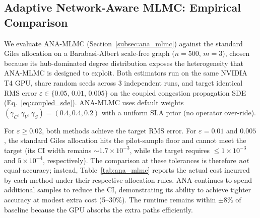 \documentclass{ieeeaccess}
\begin{document}
\subsection{Adaptive Network-Aware MLMC: Empirical Comparison}
\label{subsec:ana_results}

We evaluate ANA-MLMC (Section~\ref{subsec:ana_mlmc}) against the standard Giles allocation on a
Barabasi-Albert scale-free graph ($n=500$, $m=3$), chosen because its hub-dominated degree
distribution exposes the heterogeneity that ANA-MLMC is designed to exploit. Both estimators run
on the same NVIDIA T4 GPU, share random seeds across 3 independent runs, and target identical RMS
error $\varepsilon \in \{0.05,\,0.01,\,0.005\}$ on the coupled congestion propagation SDE
(Eq.~\eqref{eq:coupled_sde}). ANA-MLMC uses default weights
$(\gamma_C,\gamma_V,\gamma_S)=(0.4,0.4,0.2)$ with a uniform SLA prior (no operator over-ride).

For \(\varepsilon \geq 0.02\), both methods achieve the target RMS error. 
For \(\varepsilon = 0.01\) and \(0.005\), the standard Giles allocation hits the pilot-sample floor and 
cannot meet the target (its CI width remains \(\sim 1.7\times10^{-3}\), while the target requires 
\(\leq 1\times10^{-3}\) and \(5\times10^{-4}\), respectively). 
The comparison at these tolerances is therefore \emph{not} equal-accuracy; instead, Table~\ref{tab:ana_mlmc} 
reports the actual cost incurred by each method under their respective allocation rules. 
ANA continues to spend additional samples to reduce the CI, demonstrating its ability to 
achieve tighter accuracy at modest extra cost (5--30\%). The runtime remains within 
\(\pm 8\%\) of baseline because the GPU absorbs the extra paths efficiently.
\end{document}
